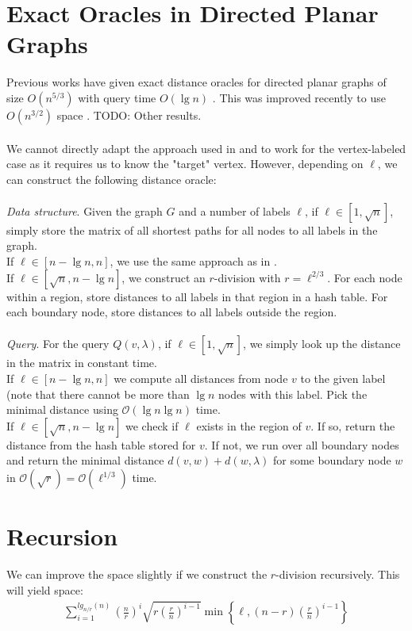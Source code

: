 \section{Exact Oracles in Directed Planar Graphs}
\label{sec:sota}
Previous works have given exact distance oracles for directed planar graphs of size
$O(n^{5/3})$ with query time $O(\lg n)$ \cite{cohen2017fast}. This was improved recently
to use $O(n^{3/2})$ space \cite{gawrychowski2017better}. TODO: Other results. \\
\\
We cannot directly adapt the approach used in \cite{cohen2017fast} and \cite{gawrychowski2017better} to work
for the vertex-labeled case as it requires us to know the "target" vertex. However,
depending on $\ell$, we can construct the following distance oracle:\\
\\
\textit{Data structure}. Given the graph $G$ and a number of labels $\ell$, if $\ell\in
[1, \sqrt{n}]$, simply store the matrix of all shortest paths for all nodes to all
labels in the graph. \\
If $\ell\in [n-\lg n, n]$, we use the same approach as in
\cite{gawrychowski2017better}. \\
If $\ell\in [\sqrt{n}, n-\lg n]$, we construct an $r$-division with $r=\ell^{2/3}$. For each node within a region, store distances to all
labels in that region in a hash table. For each boundary node, store distances to all
labels outside the region. \\
\\
\textit{Query}. For the query $Q(v, \lambda)$, if $\ell\in[1, \sqrt{n}]$, we simply look up the distance in the matrix
in constant time. \\
If $\ell\in [n-\lg n, n]$ we compute all distances from node $v$ to the given label (note
that there cannot be more than $\lg n$ nodes with this label. Pick the minimal distance
using $\mathcal{O}(\lg n\lg n)$ time. \\
If $\ell\in [\sqrt{n}, n-\lg n]$ we check if $\ell$ exists in the region of $v$. If so, return the distance from the hash table
stored for $v$. If not, we run over all boundary nodes and return the minimal distance
$d(v,w)+d(w,\lambda)$ for some boundary node $w$ in
$\mathcal{O}(\sqrt{r})=\mathcal{O}(\ell^{1/3})$ time.

\section{Recursion}
We can improve the space slightly if we construct the $r$-division recursively. This will
yield space:
\begin{align*}
  \sum_{i=1}^{lg_{n/r}(n)} \left(\frac{n}{r}\right)^i
  \sqrt{r\left(\frac{r}{n}\right)^{i-1}} \min
  \left\{\ell,\left(n-r\right)\left(\frac{r}{n}\right)^{i-1}\right\}
\end{align*}

